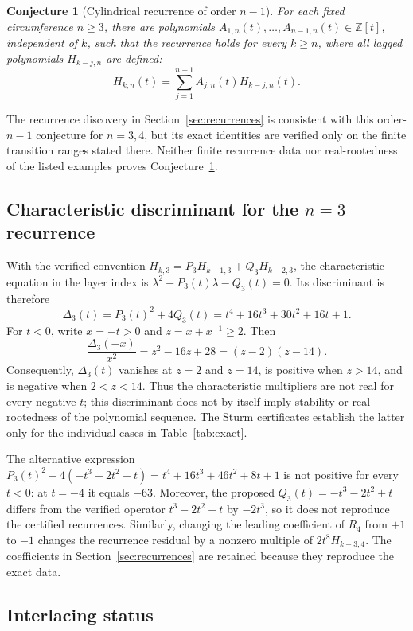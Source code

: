\documentclass[11pt,a4paper]{article}
\newtheorem{conjecture}[theorem]{Conjecture}
\theoremstyle{definition}
\begin{document}
\begin{conjecture}[Cylindrical recurrence of order $n-1$]
\label{conj:universal-recurrence}
For each fixed circumference $n\ge3$, there are polynomials
$A_{1,n}(t),\ldots,A_{n-1,n}(t)\in\mathbb{Z}[t]$, independent of $k$,
such that the recurrence holds for every $k\ge n$, where all lagged
polynomials $H_{k-j,n}$ are defined:
\[
H_{k,n}(t)=\sum_{j=1}^{n-1}A_{j,n}(t)H_{k-j,n}(t).
\]
\end{conjecture}

The recurrence discovery in Section~\ref{sec:recurrences} is consistent
with this order-$n-1$ conjecture for $n=3,4$, but its exact identities are
verified only on the finite transition ranges stated there. Neither
finite recurrence data nor real-rootedness of the listed examples proves
Conjecture~\ref{conj:universal-recurrence}.

\subsection{Characteristic discriminant for the $n=3$ recurrence}

With the verified convention $H_{k,3}=P_3H_{k-1,3}+Q_3H_{k-2,3}$, the
characteristic equation in the layer index is
$\lambda^2-P_3(t)\lambda-Q_3(t)=0$. Its discriminant is therefore
\[
\Delta_3(t)=P_3(t)^2+4Q_3(t)
=t^4+16t^3+30t^2+16t+1.
\]
For $t<0$, write $x=-t>0$ and $z=x+x^{-1}\ge2$. Then
\[
\frac{\Delta_3(-x)}{x^2}=z^2-16z+28=(z-2)(z-14).
\]
Consequently, $\Delta_3(t)$ vanishes at $z=2$ and $z=14$, is positive
when $z>14$, and is negative when $2<z<14$. Thus the characteristic
multipliers are not real for every negative $t$; this discriminant does
not by itself imply stability or real-rootedness of the polynomial
sequence. The Sturm certificates establish the latter only for the
individual cases in Table~\ref{tab:exact}.

The alternative expression
$P_3(t)^2-4(-t^3-2t^2+t)=t^4+16t^3+46t^2+8t+1$
is not positive for every $t<0$: at $t=-4$ it equals $-63$. Moreover,
the proposed $Q_3(t)=-t^3-2t^2+t$ differs from the verified operator
$t^3-2t^2+t$ by $-2t^3$, so it does not reproduce the certified
recurrences. Similarly, changing the leading coefficient of $R_4$ from
$+1$ to $-1$ changes the recurrence residual by a nonzero multiple of
$2t^8H_{k-3,4}$. The coefficients in Section~\ref{sec:recurrences} are
retained because they reproduce the exact data.

\subsection{Interlacing status}
\end{document}
